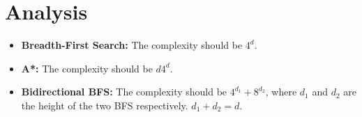 \documentclass[12pt,a4paper]{article}
\begin{document}
\section{Analysis}
    \begin{itemize}
        \item \textbf{Breadth-First Search: }
            The complexity should be $4^d$.
        \item \textbf{A*: }
            The complexity should be $d4^d$.
        \item \textbf{Bidirectional BFS: }
            The complexity should be $4^{d_1}+8^{d_2}$, where $d_1$ and $d_2$ are the height of the two BFS respectively. $d_1+d_2=d$.
    \end{itemize}
\end{document}
